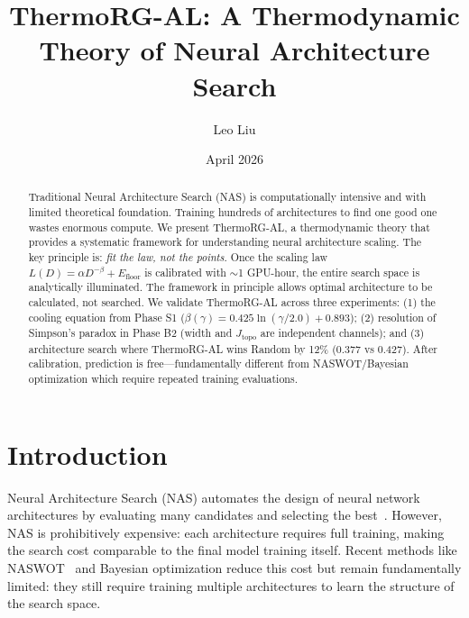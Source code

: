 \documentclass[11pt, a4paper]{article}
\theoremstyle{plain}
\begin{document}
\title{ThermoRG-AL: A Thermodynamic Theory of Neural Architecture Search}

\author{Leo Liu}

\date{April 2026}

\maketitle

\begin{abstract}
Traditional Neural Architecture Search (NAS) is computationally intensive and with limited theoretical foundation. Training hundreds of architectures to find one good one wastes enormous compute. We present ThermoRG-AL, a thermodynamic theory that provides a systematic framework for understanding neural architecture scaling. The key principle is: \emph{fit the law, not the points}. Once the scaling law $L(D) = \alpha D^{-\beta} + E_{\mathrm{floor}}$ is calibrated with $\sim$1 GPU-hour, the entire search space is analytically illuminated. The framework in principle allows optimal architecture to be calculated, not searched. We validate ThermoRG-AL across three experiments: (1) the cooling equation from Phase S1 ($\beta(\gamma) = 0.425\ln(\gamma/2.0) + 0.893$); (2) resolution of Simpson's paradox in Phase B2 (width and $J_{\mathrm{topo}}$ are independent channels); and (3) architecture search where ThermoRG-AL wins Random by 12\% (0.377 vs 0.427). After calibration, prediction is free---fundamentally different from NASWOT/Bayesian optimization which require repeated training evaluations.
\end{abstract}

\section{Introduction}

Neural Architecture Search (NAS) automates the design of neural network architectures by evaluating many candidates and selecting the best~\citep{zoph2016neural,elsken2019neural}. However, NAS is prohibitively expensive: each architecture requires full training, making the search cost comparable to the final model training itself. Recent methods like NASWOT~\citep{abdelfattah2021no} and Bayesian optimization reduce this cost but remain fundamentally limited: they still require training multiple architectures to learn the structure of the search space.
\end{document}
